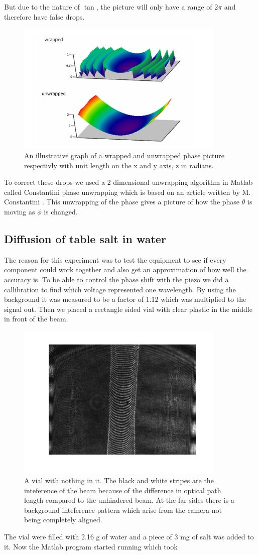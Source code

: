 But due to the nature of $\tan$, the picture will only have a range of $2\pi$
and therefore have false drops. 
\begin {figure}[ht!]
\includegraphics [width=10cm]{bilder/unwrap.png}
\caption {\cite{omst}An illustrative graph of a wrapped and unwrapped phase picture respectivly 
with unit length on the x and y axis, z in radians.}
\end {figure}
To correct these drops we used a 2 dimensional unwrapping algorithm in Matlab called
Constantini phase unwrapping which is based on an article written by M. Constantini 
\cite{const}. This unwrapping of the phase gives a picture of how the phase $\theta$ is moving
as $\phi$ is changed. 

\subsection {Diffusion of table salt in water}
The reason for this experiment was to test the equipment to see if every component
could work together and also get an approximation of how well the accuracy is.
To be able to control the phase shift with the piezo we did a callibration to find
which voltage represented one wavelength. By using the background it was measured to
be a factor of 1.12 which was multiplied to the signal out. Then we placed a rectangle 
sided vial with clear plastic in the middle in front of the beam.

\begin {figure}[ht!]
\includegraphics [width=10cm]{bilder/sample.png}
\caption {A vial with nothing in it. The black and white stripes are the inteference %
          of the beam because of the difference in optical path length compared to the %
          unhindered beam. At the far sides there is a background inteference pattern %
          which arise from the camera not being completely aligned.}
\end {figure}

The vial were filled with 2.16 g of water and a piece of 3 mg of salt was added to it.
Now the Matlab program started running which took 
